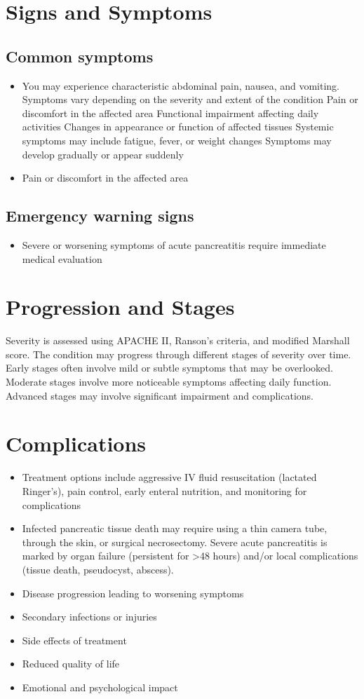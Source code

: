 \section{Signs and Symptoms}

\subsection{Common symptoms}
\begin{itemize}[noitemsep]
  \item You may experience characteristic abdominal pain, nausea, and vomiting. Symptoms vary depending on the severity and extent of the condition Pain or discomfort in the affected area Functional impairment affecting daily activities Changes in appearance or function of affected tissues Systemic symptoms may include fatigue, fever, or weight changes Symptoms may develop gradually or appear suddenly
  \item Pain or discomfort in the affected area
  \end{itemize}

\subsection{Emergency warning signs}
\begin{itemize}[noitemsep]
  \item Severe or worsening symptoms of acute pancreatitis require immediate medical evaluation
\end{itemize}
\section{Progression and Stages}
Severity is assessed using APACHE II, Ranson's criteria, and modified Marshall score. The condition may progress through different stages of severity over time. Early stages often involve mild or subtle symptoms that may be overlooked. Moderate stages involve more noticeable symptoms affecting daily function. Advanced stages may involve significant impairment and complications.
\section{Complications}
\begin{itemize}[noitemsep]
  \item Treatment options include aggressive IV fluid resuscitation (lactated Ringer's), pain control, early enteral nutrition, and monitoring for complications
  \item Infected pancreatic tissue death may require using a thin camera tube, through the skin, or surgical necrosectomy. Severe acute pancreatitis is marked by organ failure (persistent for >48 hours) and/or local complications (tissue death, pseudocyst, abscess).
  \item Disease progression leading to worsening symptoms
  \item Secondary infections or injuries
  \item Side effects of treatment
  \item Reduced quality of life
  \item Emotional and psychological impact
\end{itemize}
